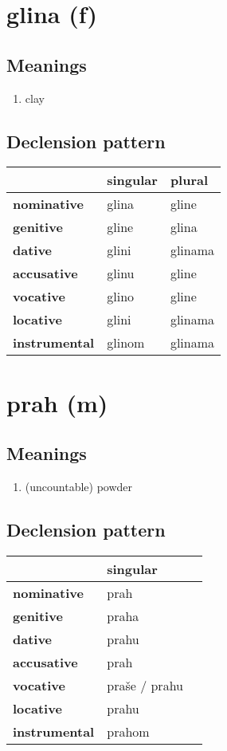 \filbreak
\section{glina (f)}
\subsection*{Meanings}
\begin{enumerate}
\item clay
\end{enumerate}
\subsection*{Declension pattern}
\begin{tabularx}{\linewidth}{Xll}
\toprule
{} & singular &   plural \\
\midrule
\textbf{nominative  } &    glina &    gline \\
\textbf{genitive    } &    gline &    glina \\
\textbf{dative      } &    glini &  glinama \\
\textbf{accusative  } &    glinu &    gline \\
\textbf{vocative    } &    glino &    gline \\
\textbf{locative    } &    glini &  glinama \\
\textbf{instrumental} &   glinom &  glinama \\
\bottomrule
\end{tabularx}

\filbreak
\section{prah (m)}
\subsection*{Meanings}
\begin{enumerate}
\item (uncountable) powder
\end{enumerate}
\subsection*{Declension pattern}
\begin{tabularx}{\linewidth}{Xll}
\toprule
{} &       singular \\
\midrule
\textbf{nominative  } &           prah \\
\textbf{genitive    } &          praha \\
\textbf{dative      } &          prahu \\
\textbf{accusative  } &           prah \\
\textbf{vocative    } &  praše / prahu \\
\textbf{locative    } &          prahu \\
\textbf{instrumental} &         prahom \\
\bottomrule
\end{tabularx}


